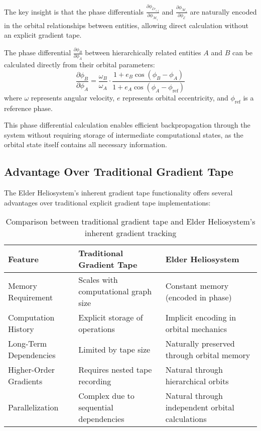 The key insight is that the phase differentials $\frac{\partial \phi_{\mathcal{E}r_{i,j}}}{\partial \phi_{\mathcal{M}_i}}$ and $\frac{\partial \phi_{\mathcal{M}_i}}{\partial \phi_{\mathcal{E}}}$ are naturally encoded in the orbital relationships between entities, allowing direct calculation without an explicit gradient tape.

\begin{theorem}
The phase differential $\frac{\partial \phi_B}{\partial \phi_A}$ between hierarchically related entities $A$ and $B$ can be calculated directly from their orbital parameters:
\begin{equation}
\frac{\partial \phi_B}{\partial \phi_A} = \frac{\omega_B}{\omega_A} \cdot \frac{1 + e_B \cos(\phi_B - \phi_A)}{1 + e_A \cos(\phi_A - \phi_{\text{ref}})}
\end{equation}
where $\omega$ represents angular velocity, $e$ represents orbital eccentricity, and $\phi_{\text{ref}}$ is a reference phase.
\end{theorem}

This phase differential calculation enables efficient backpropagation through the system without requiring storage of intermediate computational states, as the orbital state itself contains all necessary information.

\subsection{Advantage Over Traditional Gradient Tape}

The Elder Heliosystem's inherent gradient tape functionality offers several advantages over traditional explicit gradient tape implementations:

\begin{table}[h]
\centering
\begin{tabular}{|p{4cm}|p{5cm}|p{5cm}|}
\hline
\textbf{Feature} & \textbf{Traditional Gradient Tape} & \textbf{Elder Heliosystem} \\
\hline
Memory Requirement & Scales with computational graph size & Constant memory (encoded in phase) \\
\hline
Computation History & Explicit storage of operations & Implicit encoding in orbital mechanics \\
\hline
Long-Term Dependencies & Limited by tape size & Naturally preserved through orbital memory \\
\hline
Higher-Order Gradients & Requires nested tape recording & Natural through hierarchical orbits \\
\hline
Parallelization & Complex due to sequential dependencies & Natural through independent orbital calculations \\
\hline
\end{tabular}
\caption{Comparison between traditional gradient tape and Elder Heliosystem's inherent gradient tracking}
\label{tab:gradient_tape_comparison}
\end{table}

